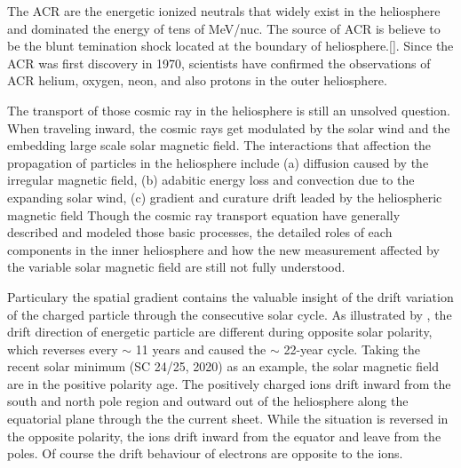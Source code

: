 The \ac{ACR} are the energetic ionized neutrals that widely exist in the heliosphere and dominated the energy of tens of MeV/nuc. The source of \ac{ACR} is believe to be the blunt temination shock located at the boundary of heliosphere.[\citation]. Since the \ac{ACR} was first discovery in 1970, scientists have confirmed the observations of \ac{ACR} helium, oxygen, neon, and also protons in the outer heliosphere. 

The transport of those cosmic ray in the heliosphere is still an unsolved question. When traveling inward, the cosmic rays get modulated by the solar wind and the embedding large scale solar magnetic field. The interactions that affection the propagation of particles in the heliosphere include (a) diffusion caused by the irregular magnetic field, (b) adabitic energy loss and convection due to the expanding solar wind,  (c) gradient and curature drift leaded by the heliospheric magnetic field
Though the cosmic ray transport equation have generally described and modeled those basic processes, the detailed roles of each components in the inner heliosphere and how the new measurement affected by the variable solar magnetic field are still not fully understood. \citep{Rankin2021ApJ}

Particulary the spatial gradient contains the valuable insight of the drift variation of the charged particle through the consecutive solar cycle. As illustrated by \citet{Jokipii1977ApJ, Jokipii1979ApJ, Potgieter2013LRSP}, the drift direction of energetic particle are different during opposite solar polarity, which reverses every $\sim$ 11 years and caused the $\sim$ 22-year cycle. Taking the recent solar minimum (\ac{SC} 24/25, 2020) as an example, the solar magnetic field are in the positive polarity age. The positively charged ions drift inward from the south and north pole region and outward out of the heliosphere along the equatorial plane through the the current sheet. While the situation is reversed in the opposite polarity, the ions drift inward from the equator and leave from the poles. Of course the drift behaviour of electrons are opposite to the ions.

